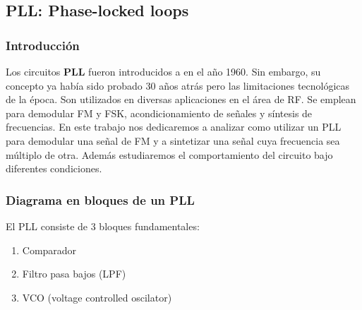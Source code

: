 

	\subsection{PLL: Phase-locked loops}
	\subsubsection{Introducción}
	Los circuitos \textbf{PLL} fueron introducidos a en el año 1960. Sin embargo, su concepto ya había sido probado 30 años atrás pero las limitaciones tecnológicas de la época. Son utilizados en diversas aplicaciones en el área de RF. Se emplean para demodular FM y FSK, acondicionamiento de señales y síntesis de frecuencias. En este trabajo nos dedicaremos a analizar como utilizar un PLL para demodular una señal de FM y a sintetizar una señal cuya frecuencia sea múltiplo de otra. Además estudiaremos el comportamiento del circuito bajo diferentes condiciones.
	
	\subsubsection{Diagrama en bloques de un PLL}
	El PLL consiste de 3 bloques fundamentales:
	
	\begin{enumerate}
		\item  Comparador
		\item  Filtro pasa bajos (LPF)
		\item  VCO (voltage controlled oscilator) 
	\end{enumerate}
	
